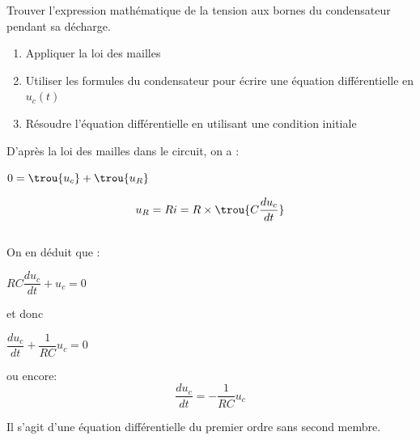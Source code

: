  Trouver l'expression mathématique de la tension  aux bornes du condensateur pendant sa décharge.\\
\begin{enumerate}
	\item Appliquer la loi des mailles
	\item Utiliser les formules du condensateur pour écrire une équation différentielle en $u_c(t)$
	\item Résoudre l'équation différentielle en utilisant une condition initiale
\end{enumerate}

D'après la loi des mailles dans le circuit, on a :
\begin{center}
$0=\trou{u_c}+\trou{u_R}$ 
\end{center}
$$u_R=Ri=R\times \trou{C\dfrac{du_c}{dt}}$$
\\

On en déduit que :
\begin{center}
$RC\dfrac{du_c}{dt}+u_c=0$\\
\end{center}

et donc \begin{center}
$\dfrac{du_c}{dt}+\dfrac{1}{RC}u_c=0$
\end{center}
ou encore: $$\boxed{\dfrac{du_c}{dt}=-\dfrac{1}{RC}u_c}$$

Il s'agit d'une équation différentielle du premier ordre sans second membre.\\


